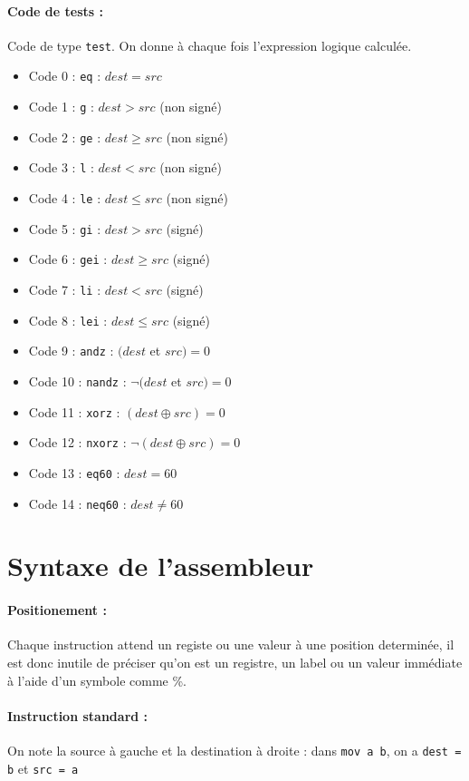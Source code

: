 \documentclass[12pt]{article}
\begin{document}
\paragraph{Code de tests :} Code de type \verb!test!. On donne à chaque fois
l'expression logique calculée.
\begin{itemize}
\item Code 0 : \verb!eq! : $dest = src$
\item Code 1 : \verb!g! : $dest > src$ (non signé)
\item Code 2 : \verb!ge! : $dest \ge src$ (non signé)
\item Code 3 : \verb!l! : $dest < src$ (non signé)
\item Code 4 : \verb!le! : $dest \le src$ (non signé)
\item Code 5 : \verb!gi! : $dest > src$ (signé)
\item Code 6 : \verb!gei! : $dest \ge src$ (signé)
\item Code 7 : \verb!li! : $dest < src$ (signé)
\item Code 8 : \verb!lei! : $dest \le src$ (signé)
\item Code 9 : \verb!andz! : $(dest$ et $src) = 0$
\item Code 10 : \verb!nandz! : $\neg(dest$ et $src) = 0$
\item Code 11 : \verb!xorz! : $(dest \oplus src) = 0$
\item Code 12 : \verb!nxorz! : $\neg(dest \oplus src) = 0$
\item Code 13 : \verb!eq60! : $dest = 60$
\item Code 14 : \verb!neq60! : $dest \neq 60$
\end{itemize}

\section{Syntaxe de l'assembleur}

\paragraph{Positionement :} Chaque instruction attend un registe ou une valeur à
une position determinée, il est donc inutile de préciser qu'on est un registre,
un label ou un valeur immédiate à l'aide d'un symbole comme \%.


\paragraph{Instruction standard :} On note la source à gauche et la destination
à droite : dans \verb!mov a b!, on a \verb!dest = b! et \verb!src = a!
\end{document}
